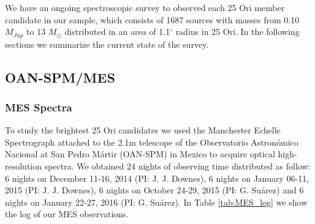 \documentclass[12pt]{article}
\begin{document}
We have an ongoing spectroscopic survey to observed each 25 Ori member candidate in our sample, which consists of 1687 sources with masses from 0.10 $M_{Jup}$ to 13 $M_\odot$ distributed in an area of 1.1$^\circ$ radius in 25 Ori. In the following sections we summarize the current state of the survey.


\subsection{OAN-SPM/MES}
\label{sec:MES}

\subsubsection{MES Spectra}
\label{sec_echelle:spectra}
To study the brightest 25 Ori candidates we used the Manchester Echelle Spectrograph \citep[MES; ][]{Meaburn1984,Meaburn2003} attached to the 2.1m telescope of the Observatorio Astron\'omico Nacional at San Pedro M\'artir (OAN-SPM) in Mexico to acquire optical high-resolution spectra. We obtained 24 nights of observing time distributed as follow: 6 nights on December 11-16, 2014 (PI: J. J. Downes), 6 nights on January 06-11, 2015 (PI: J. J. Downes), 6 nights on October 24-29, 2015 (PI: G. Su\'arez) and 6 nights on January 22-27, 2016 (PI: G. Su\'arez). In Table \ref{tab:MES_log} we show the log of our MES observations.
\end{document}
